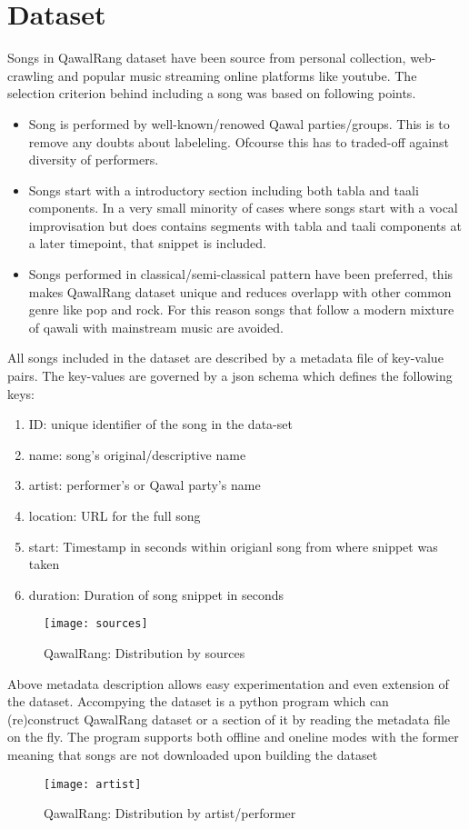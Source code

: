 \documentclass{article}
\begin{document}
\section{Dataset}\label{sec:data}
Songs in QawalRang dataset have been source from personal collection, web-crawling and popular music streaming online platforms like youtube. The selection criterion behind including a song was based on following points.
\begin{itemize}
\item Song is performed by well-known/renowed Qawal parties/groups. This is to remove any doubts about labeleling. Ofcourse this has to traded-off against diversity of performers.
\item Songs start with a introductory section including both tabla and taali components. In a very small minority of cases where songs start with a vocal improvisation but does contains segments with tabla and taali components at a later timepoint, that snippet is included.
\item Songs performed in classical/semi-classical pattern have been preferred, this makes QawalRang dataset unique and reduces overlapp with other common genre like pop and rock. For this reason songs that follow a modern mixture of qawali with mainstream music are avoided.
\end{itemize}

All songs included in the dataset are described by a metadata file of key-value pairs. The key-values are governed by a json schema which defines the following keys:
\begin{enumerate}
\item ID: unique identifier of the song in the data-set
\item name: song's original/descriptive name
\item artist: performer's or Qawal party's name
\item location: URL for the full song
\item start: Timestamp in seconds within origianl song from where snippet was taken
\item duration: Duration of song snippet in seconds
\end{enumerate}

\begin{figure}[htbp]
  \centering
  \texttt{[image: sources]}
  \caption{QawalRang: Distribution by sources}
\label{fig:figure}
\end{figure}
Above metadata description allows easy experimentation and even extension of the dataset. Accompying the dataset is a python program which can (re)construct QawalRang dataset or a section of it by reading the metadata file on the fly. The program supports both offline and oneline modes with the former meaning that songs are not downloaded upon building the dataset
\begin{figure}[htbp]
  \centering
  \texttt{[image: artist]}
  \caption{QawalRang: Distribution by artist/performer}
\label{fig:figure}
\end{figure}
\end{document}
